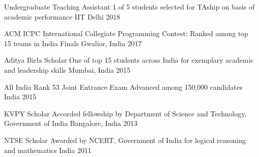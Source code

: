 



\begin{cvhonors}
  \cvhonor
    {Undergraduate Teaching Assistant} %
    {1 of 5 students selected for TAship on basis of academic performance} %
    {IIT Delhi} %
    {2018} %

  \cvhonor
    {ACM ICPC} %
    {International Collegiate Programming Contest: Ranked among top 15 teams in India Finals} %
    {Gwalior, India} %
    {2017} %

  \cvhonor
    {Aditya Birla Scholar} %
    {One of top 15 students across India for exemplary academic and leadership skills} %
    {Mumbai, India} %
    {2015} %

  \cvhonor
    {All India Rank 53} %
    {Joint Entrance Exam Advanced among 150,000 candidates} %
    {India} %
    {2015} %

  \cvhonor
    {KVPY Scholar} %
    {Accorded fellowship by Department of Science and Technology, Government of India} %
    {Bangalore, India} %
    {2013} %

  \cvhonor
    {NTSE Scholar} %
    {Awarded by NCERT, Government of India for logical reasoning and mathematics} %
    {India} %
    {2011} %

\end{cvhonors}


